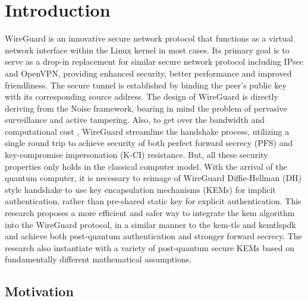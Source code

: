 \chapter{Introduction}

WireGuard is an innovative secure network protocol that functions as a virtual network interface within the Linux kernel in most cases. Its primary goal is to serve as a drop-in replacement for similar secure network protocol including IPsec and OpenVPN, providing enhanced security, better performance and improved friendliness. The secure tunnel is established by binding the peer's public key with its corresponding source address. The design of WireGuard is directly deriving from the Noise framework, bearing in mind the problem of pervasive surveillance and active tampering. Also, to get over the bandwidth and computational cost , WireGuard streamline the handshake process, utilizing a single round trip to achieve security of both perfect forward secrecy (PFS) and key-compromise impersonation (K-CI) resistance. But, all these security properties only holds in the classical computer model. With the arrival of the quantum computer, it is necessary to reimage of WireGuard Diffie-Hellman (DH) style handshake to use key encapsulation mechanisms (KEMs) for implicit authentication, rather than pre-shared static key for explicit authentication. 
This research proposes a more efficient and safer way to integrate the kem algorithm into the WireGuard protocol, in a similar manner to the kem-tls and kemtlspdk and achieve both post-quantum authentication and stronger forward secrecy. The research also instantiate with a variety of post-quantum secure KEMs based on fundamentally different mathematical assumptions. 
\section{Motivation}
\label{sec:StyleOfEnglish}

